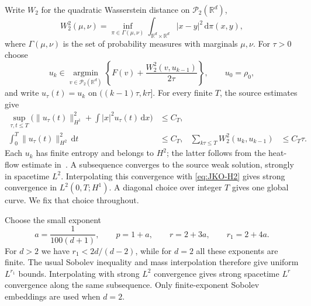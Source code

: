 \documentclass[11pt]{article}
\numberwithin{equation}{section}
\theoremstyle{definition}
\theoremstyle{remark}
\newcommand{\R}{\mathbb R}
\newcommand{\Ptwo}{\mathcal P_2(\R^d)}
\newcommand{\dd}{\,\mathrm d}
\newcommand{\norm}[1]{\lVert #1\rVert}
\begin{document}
Write $W_2$ for the quadratic Wasserstein distance on $\Ptwo$,
\[
 W_2^2(\mu,\nu)=\inf_{\pi\in\Gamma(\mu,\nu)}
       \int_{\R^d\times\R^d}|x-y|^2\dd\pi(x,y),
\]
where $\Gamma(\mu,\nu)$ is the set of probability measures with marginals
$\mu,\nu$. For $\tau>0$ choose
\begin{equation}\label{eq:JKO}
 u_k\in\operatorname*{argmin}_{v\in\Ptwo}
 \left\{F(v)+\frac{W_2^2(v,u_{k-1})}{2\tau}\right\},
 \qquad u_0=\rho_0,
\end{equation}
and write $u_\tau(t)=u_k$ on $((k-1)\tau,k\tau]$.
For every finite $T$, the source estimates give
\begin{align}
 \sup_{\tau,t\le T}\bigl(\norm{u_\tau(t)}_{H^1}^2
           +\textstyle\int |x|^2u_\tau(t)\dd x\bigr)&\le C_T,
                    \label{eq:JKO-H1}\\
 \int_0^T\norm{u_\tau(t)}_{H^2}^2\dd t&\le C_T,
 &\sum_{k\tau\le T}W_2^2(u_k,u_{k-1})&\le C_T\tau.
                    \label{eq:JKO-H2}
\end{align}
Each $u_k$ has finite entropy and belongs to $H^2$; the latter follows from
the heat-flow estimate in~\cite[Lemma~4.2]{CEFF}. A subsequence converges to
the source weak solution, strongly in spacetime $L^2$. Interpolating this
convergence with \eqref{eq:JKO-H2} gives strong convergence in
$L^2(0,T;H^1)$. A diagonal choice over integer $T$ gives one global curve.
We fix that choice throughout.

Choose the small exponent
\begin{equation}\label{eq:exponents}
 a=\frac1{100(d+1)},\qquad p=1+a,\qquad r=2+3a,\qquad r_1=2+4a.
\end{equation}
For $d>2$ we have $r_1<2d/(d-2)$, while for $d=2$ all these exponents
are finite. The usual Sobolev inequality and mass interpolation therefore
give uniform $L^{r_1}$ bounds. Interpolating with strong $L^2$ convergence
gives strong spacetime $L^r$ convergence along the same subsequence.
Only finite-exponent Sobolev embeddings are used when $d=2$.
\end{document}
